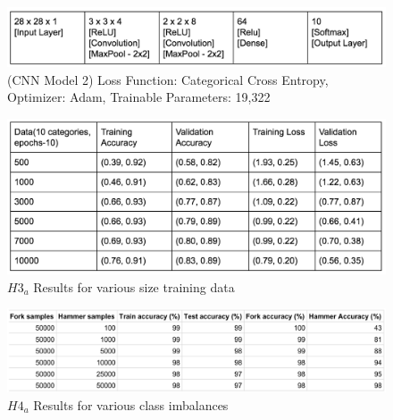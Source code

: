 \documentclass[11pt]{article}
\begin{document}
\begin{figure}[h!]
  \begin{center}
    \includegraphics[scale=0.5]{fig4}
  \end{center}
  \caption{(CNN Model 2) Loss Function: Categorical Cross Entropy, Optimizer:
    Adam, Trainable Parameters: 19,322}
  \label{fig:cnnArchPool}
\end{figure}


\begin{figure}[h!]
  \begin{center}
    \includegraphics[scale=0.5]{fig8}
    \end{center}
  \caption{$H3_a$ Results for various size training data}
  \label{fig:h3Results}
  \end{figure}


\begin{figure}[h!]
  \begin{center}
    \includegraphics[scale=0.5]{fig9}
    \end{center}
  \caption{$H4_a$ Results for various class imbalances}
  \label{fig:h4Results}
\end{figure}

\end{document}
